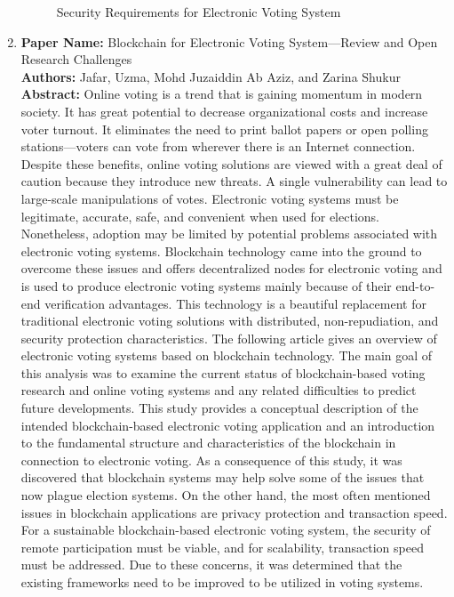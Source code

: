 \documentclass[oneside, 12pt]{book}
\begin{document}
\begin{enumerate}
\begin{figure}[H]
		      \caption{Security Requirements for Electronic Voting System}
		      \label{fig:security-requirements}
	      \end{figure}
	\item
	      \textbf{Paper Name:} Blockchain for Electronic Voting System—Review and Open Research Challenges \cite{jafar2021blockchain}\\
	      \textbf{Authors:} Jafar, Uzma, Mohd Juzaiddin Ab Aziz, and Zarina Shukur\\
	      \textbf{Abstract:} Online voting is a trend that is gaining momentum in modern society. It has great potential to decrease organizational costs and increase voter turnout. It eliminates the need to print ballot papers or open polling stations—voters can vote from wherever there is an Internet connection. Despite these benefits, online voting solutions are viewed with a great deal of caution because they introduce new threats. A single vulnerability can lead to large-scale manipulations of votes. Electronic voting systems must be legitimate, accurate, safe, and convenient when used for elections. Nonetheless, adoption may be limited by potential problems associated with electronic voting systems. Blockchain technology came into the ground to overcome these issues and offers decentralized nodes for electronic voting and is used to produce electronic voting systems mainly because of their end-to-end verification advantages. This technology is a beautiful replacement for traditional electronic voting solutions with distributed, non-repudiation, and security protection characteristics. The following article gives an overview of electronic voting systems based on blockchain technology. The main goal of this analysis was to examine the current status of blockchain-based voting research and online voting systems and any related difficulties to predict future developments. This study provides a conceptual description of the intended blockchain-based electronic voting application and an introduction to the fundamental structure and characteristics of the blockchain in connection to electronic voting. As a consequence of this study, it was discovered that blockchain systems may help solve some of the issues that now plague election systems. On the other hand, the most often mentioned issues in blockchain applications are privacy protection and transaction speed. For a sustainable blockchain-based electronic voting system, the security of remote participation must be viable, and for scalability, transaction speed must be addressed. Due to these concerns, it was determined that the existing frameworks need to be improved to be utilized in voting systems.\\

\end{enumerate}
\end{document}
